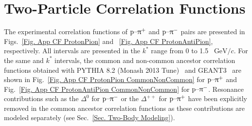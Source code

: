 \documentclass[ALICE,manyauthors]{cernphprep}
\begin{document}
\nocite{*}


\newpage
\appendix



\section{Two-Particle Correlation Functions}
\label{App. Two-Body CFs}
The experimental correlation functions of $\text{p--}\uppi^+$ and $\text{p--}\uppi^-$ pairs are presented in Figs.~\ref{Fig. App CF ProtonPion} and ~\ref{Fig. App CF ProtonAntiPion}, respectively. All \mtText{} intervals are presented in the $k^*$ range from 0 to 1.5~$\text{ GeV}/c$. For the same \mtText{} and $k^*$ intervals, the common and non-common ancestor correlation functions obtained with PYTHIA 8.2 (Monash 2013 Tune)~\cite{Sjostrand:2014zea, Skands:2014pea} and GEANT3~\cite{GEANT3} are shown in Fig.~\ref{Fig. App CF ProtonPion CommonNonCommon} for $\text{p--}\uppi^+$ and Fig.~\ref{Fig. App CF ProtonAntiPion CommonNonCommon} for $\text{p--}\uppi^-$. Resonance contributions such as the $\Delta^0$ for $\text{p--}\uppi^-$ or the $\Delta^{++}$ for $\text{p--}\uppi^+$ have been explicitly removed in the common ancestor correlation functions as these contributions are modeled separately (see Sec.~\ref{Sec. Two-Body Modeling}).
\end{document}
